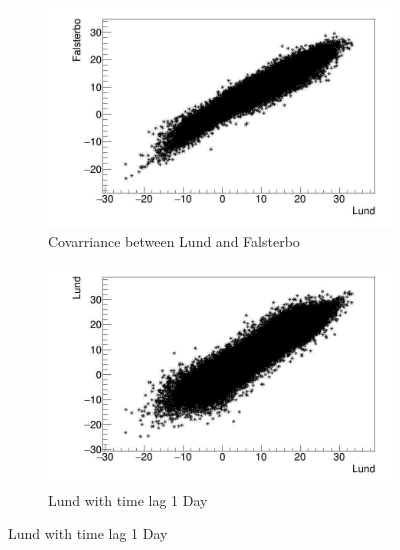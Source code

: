 \begin{figure}[h]
    \centering
    \begin{subfigure}[b]{0.49\textwidth}
    \centering
    \includegraphics[width=\textwidth]{LU_FAL_E.jpg}
        \caption{Covarriance between Lund and Falsterbo}
    \end{subfigure}
    \hfill
    \begin{subfigure}[b]{0.49\textwidth}
    \centering
    \includegraphics[width=\textwidth]{LU_LU_1D_E.jpg}
        \caption{Lund with time lag 1 Day}
    \end{subfigure}
    

\end{figure}
